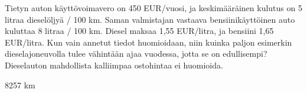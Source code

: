 \begin{tehtava}
	Tietyn auton käyttövoimavero on 450 EUR/vuosi, ja keskimääräinen kulutus on 5 litraa dieselöljyä / 100 km. Saman valmistajan vastaava bensiinikäyttöinen auto kuluttaa 8 litraa / 100 km. Diesel maksaa 1,55 EUR/litra, ja bensiini 1,65 EUR/litra. Kun vain annetut tiedot huomioidaan, niin kuinka paljon esimerkin dieselajoneuvolla tulee vähintään ajaa vuodessa, jotta se on edullisempi? Dieselauton mahdollista kalliimpaa ostohintaa ei huomioida.
    \begin{vastaus}
        \item 8257 km
    \end{vastaus}
\end{tehtava}
